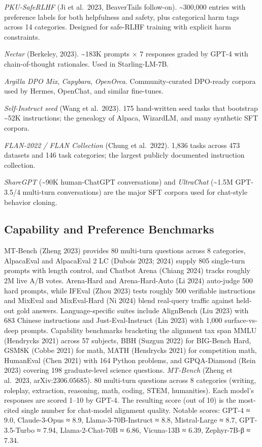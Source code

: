 \emph{PKU-SafeRLHF} (Ji et al.~2023, BeaverTails follow-on). \textasciitilde300,000 entries with preference labels for both helpfulness and safety, plus categorical harm tags across 14 categories. Designed for safe-RLHF training with explicit harm constraints.

\emph{Nectar} (Berkeley, 2023). \textasciitilde183K prompts × 7 responses graded by GPT-4 with chain-of-thought rationales. Used in Starling-LM-7B.

\emph{Argilla DPO Mix}, \emph{Capybara}, \emph{OpenOrca}. Community-curated DPO-ready corpora used by Hermes, OpenChat, and similar fine-tunes.

\emph{Self-Instruct seed} (Wang et al.~2023). 175 hand-written seed tasks that bootstrap \textasciitilde52K instructions; the genealogy of Alpaca, WizardLM, and many synthetic SFT corpora.

\emph{FLAN-2022 / FLAN Collection} (Chung et al.~2022). 1,836 tasks across 473 datasets and 146 task categories; the largest publicly documented instruction collection.

\emph{ShareGPT} (\textasciitilde90K human-ChatGPT conversations) and \emph{UltraChat} (\textasciitilde1.5M GPT-3.5/4 multi-turn conversations) are the major SFT corpora used for chat-style behavior cloning.

\subsection{Capability and Preference Benchmarks}\label{capability-and-preference-benchmarks}

MT-Bench (Zheng 2023) provides 80 multi-turn questions across 8 categories, AlpacaEval and AlpacaEval 2 LC (Dubois 2023; 2024) supply 805 single-turn prompts with length control, and Chatbot Arena (Chiang 2024) tracks roughly 2M live A/B votes. Arena-Hard and Arena-Hard-Auto (Li 2024) auto-judge 500 hard prompts, while IFEval (Zhou 2023) tests roughly 500 verifiable instructions and MixEval and MixEval-Hard (Ni 2024) blend real-query traffic against held-out gold answers. Language-specific suites include AlignBench (Liu 2023) with 683 Chinese instructions and Just-Eval-Instruct (Lin 2023) with 1,000 surface-vs-deep prompts. Capability benchmarks bracketing the alignment tax span MMLU (Hendrycks 2021) across 57 subjects, BBH (Suzgun 2022) for BIG-Bench Hard, GSM8K (Cobbe 2021) for math, MATH (Hendrycks 2021) for competition math, HumanEval (Chen 2021) with 164 Python problems, and GPQA-Diamond (Rein 2023) covering 198 graduate-level science questions. \emph{MT-Bench} (Zheng et al.~2023, arXiv:2306.05685). 80 multi-turn questions across 8 categories (writing, roleplay, extraction, reasoning, math, coding, STEM, humanities). Each model's responses are scored 1--10 by GPT-4. The resulting score (out of 10) is the most-cited single number for chat-model alignment quality. Notable scores: GPT-4 ≈ 9.0, Claude-3-Opus ≈ 8.9, Llama-3-70B-Instruct ≈ 8.8, Mistral-Large ≈ 8.7, GPT-3.5-Turbo ≈ 7.94, Llama-2-Chat-70B ≈ 6.86, Vicuna-13B ≈ 6.39, Zephyr-7B-β ≈ 7.34.

